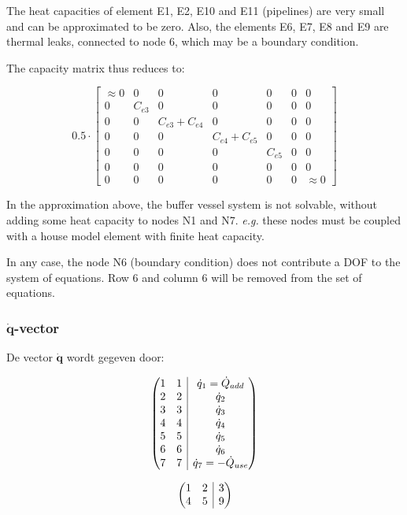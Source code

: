 The heat capacities of element E1, E2, E10 and E11 (pipelines) are very small and can be approximated to be zero. Also, the elements E6, E7, E8 and E9 are thermal leaks, connected to node 6, which may be a boundary condition.

The capacity matrix thus reduces to:

\[
0.5 \cdot 
\begin{bmatrix}
	\approx 0 & 0 & 0 & 0 & 0 & 0 & 0 \\
	0 & C_{e3} & 0 & 0 & 0 & 0 & 0 \\
	0 & 0 & C_{e3} + C_{e4} & 0 & 0 & 0 & 0 \\
	0 & 0 & 0 & C_{e4} + C_{e5} & 0 & 0 & 0 \\
	0 & 0 & 0 & 0 & C_{e5} & 0 & 0 \\
	0 & 0 & 0 & 0 & 0 & 0 & 0 \\
	0 & 0 & 0 & 0 & 0 & 0 & \approx 0
\end{bmatrix}
\]

In the approximation above, the buffer vessel system is not solvable, without adding some heat capacity to nodes N1 and N7. \emph{e.g.} these nodes must be coupled with a house model element with finite heat capacity.

In any case, the node N6 (boundary condition) does not contribute a DOF to the system of equations. Row 6 and column 6 will be removed from the set of equations.

\subsubsection{$\mathbf{\dot{q}}$-vector}

De vector $\mathbf{\dot{q}}$ wordt gegeven door:

\[
\left(\hspace{-5pt}\begin{array}{cc|c}
	1 & 1 & \dot{q}_1 = \dot{Q}_{add}\\
	2 & 2 & \dot{q}_2\\
	3 & 3 & \dot{q}_3\\
	4 & 4 & \dot{q}_4\\
	5 & 5 & \dot{q}_5\\
	6 & 6 & \dot{q}_6\\
	7 & 7 & \dot{q}_7 = -\dot{Q}_{use}
\end{array}\hspace{-5pt}\right)
\]

\[
\left(\hspace{-5pt}\begin{array}{cc|c}
	1 & 2 & 3 \\
	4 & 5 & 9
\end{array}\hspace{-5pt}\right)
\]

